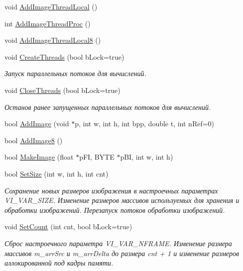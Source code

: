 \begin{DoxyCompactItemize}
\item 
void \hyperlink{class_c_v_i_engine_base_a6ca94a8d39e8a76e5be4698cc2eff06b}{Add\+Image\+Thread\+Local} ()
\item 
int \hyperlink{class_c_v_i_engine_base_ac9fbe14762f4d2bf7d0bffe451a329ee}{Add\+Image\+Thread\+Proc} ()
\item 
void \hyperlink{class_c_v_i_engine_base_a180f4a67ef6b4137c8b8565310aa7834}{Add\+Image\+Thread\+Local8} ()
\item 
void \hyperlink{class_c_v_i_engine_base_a053908c9c2c18583a13e6f6f79c8eeab}{Create\+Threads} (bool b\+Lock=true)
\begin{DoxyCompactList}\small\item\em Запуск параллельных потоков для вычислений. \end{DoxyCompactList}\item 
void \hyperlink{class_c_v_i_engine_base_a0905eba46bb64f25a2d91f8b39a3f994}{Close\+Threads} (bool b\+Lock=true)
\begin{DoxyCompactList}\small\item\em Останов ранее запущенных параллельных потоков для вычислений. \end{DoxyCompactList}\item 
bool \hyperlink{class_c_v_i_engine_base_ac886baeaf14b16970d089edaf6767a79}{Add\+Image} (void $\ast$p, int w, int h, int bpp, double t, int n\+Ref=0)
\item 
bool \hyperlink{class_c_v_i_engine_base_a3fe6ae4f9ac6b9422c22d99878f424f5}{Add\+Image8} ()
\item 
bool \hyperlink{class_c_v_i_engine_base_a3426944a03bac2f5a8c135c217f9cf8c}{Make\+Image} (float $\ast$p\+F\+I, B\+Y\+T\+E $\ast$p\+B\+I, int w, int h)
\item 
bool \hyperlink{class_c_v_i_engine_base_a930661f73cc7c449c166071631be595d}{Set\+Size} (int w, int h, int cnt)
\begin{DoxyCompactList}\small\item\em Сохранение новых размеров изображения в настроечных параметрах V\+I\+\_\+\+V\+A\+R\+\_\+\+S\+I\+Z\+E. Изменение размеров массивов используемых для хранения и обработки изображений. Перезапуск потоков обработки изображений. \end{DoxyCompactList}\item 
void \hyperlink{class_c_v_i_engine_base_a042d710f3a5be21538478ad157680828}{Set\+Count} (int cnt, bool b\+Lock=true)
\begin{DoxyCompactList}\small\item\em Сброс настроечного параметра V\+I\+\_\+\+V\+A\+R\+\_\+\+N\+F\+R\+A\+M\+E. Изменение размера массивов m\+\_\+arr\+Src и m\+\_\+arr\+Delta до размера cnt + 1 и изменение размеров аллокированной под кадры памяти. \end{DoxyCompactList}\item 

\end{DoxyCompactItemize}
